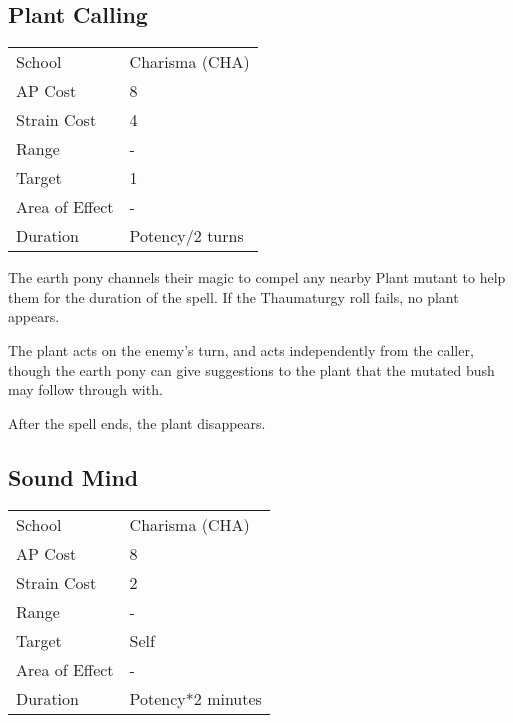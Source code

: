 \documentclass[11pt,a4paper,twocolumn]{book}
\begin{document}
\subsection*{Plant Calling}
{
	\begin{tabu} to 75mm{| X[l,4] | X[l,7] |}
		\hline
		School 			& Charisma (CHA) 	\\
		AP Cost	      	& 8 				\\
		Strain Cost     & 4 				\\
		Range     		& - 				\\
		Target      	& 1 	\\
		Area of Effect  & - 	 			\\
		Duration     	& Potency/2 turns 	\\ \hline
	\end{tabu}
	
}

\medskip

The earth pony channels their magic to compel any nearby Plant mutant to help them for the duration of the spell. If the Thaumaturgy roll fails, no plant appears.

The plant acts on the enemy's turn, and acts independently from the caller, though the earth pony can give suggestions to the plant that the mutated bush may follow through with.

After the spell ends, the plant disappears.

\subsection*{Sound Mind}
{
	\begin{tabu} to 75mm{| X[l,4] | X[l,7] |}
		\hline
		School 			& Charisma (CHA) 	\\
		AP Cost	      	& 8 				\\
		Strain Cost     & 2 				\\
		Range     		& - 				\\
		Target      	& Self 				\\
		Area of Effect  & - 	 			\\
		Duration     	& Potency*2 minutes \\ \hline
	\end{tabu}
	
}

\medskip
\end{document}
